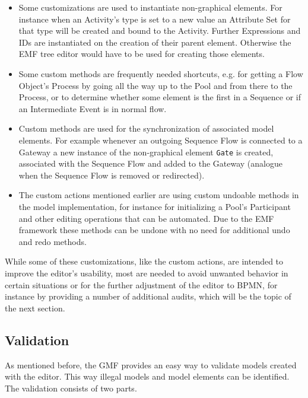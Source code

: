 \begin{itemize}

	\item Some customizations are used to instantiate non-graphical elements. For instance when an Activity's type is set to a new value an Attribute Set for that type will be created and bound to the Activity. Further Expressions and IDs are instantiated on the creation of their parent element. Otherwise the EMF tree editor would have to be used for creating those elements.
	
	\item Some custom methods are frequently needed shortcuts, e.g. for getting a Flow Object's Process by going all the way up to the Pool and from there to the Process, or to determine whether some element is the first in a Sequence or if an Intermediate Event is in normal flow.
	
	\item Custom methods are used for the synchronization of associated model elements. For example whenever an outgoing Sequence Flow is connected to a Gateway a new instance of the non-graphical element \verb|Gate| is created, associated with the Sequence Flow and added to the Gateway (analogue when the Sequence Flow is removed or redirected).
	
	\item The custom actions mentioned earlier are using custom undoable methods in the model implementation, for instance for initializing a Pool's Participant and other editing operations that can be automated. Due to the EMF framework these methods can be undone with no need for additional undo and redo methods.

\end{itemize}

While some of these customizations, like the custom actions, are intended to improve the editor's usability, most are needed to avoid unwanted behavior in certain situations or for the further adjustment of the editor to BPMN, for instance by providing a number of additional audits, which will be the topic of the next section.


\subsection{Validation}
\label{sec:validation}

As mentioned before, the GMF provides an easy way to validate models created with the editor. This way illegal models and model elements can be identified. The validation consists of two parts.

